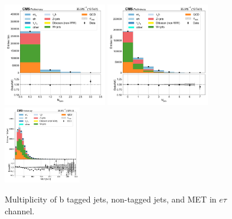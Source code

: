 \begin{figure}[htb!]
    \centering
    \includegraphics[width=0.4\textwidth]{chapters/Appendix/sectionPlots/figures/data_mc_overlays/etau_2016_inclusive_linear_jet_n_bjets}
    \includegraphics[width=0.4\textwidth]{chapters/Appendix/sectionPlots/figures/data_mc_overlays/etau_2016_inclusive_linear_jet_n_jets}
    \includegraphics[width=0.3\textwidth]{chapters/Appendix/sectionPlots/figures/data_mc_overlays/etau_2016_inclusive_linear_misc_met_mag}
    \caption{Multiplicity of b tagged jets, non-tagged jets, and MET in
        $e\tau$ channel.}
    \label{fig:etau_jetmet}
\end{figure}

